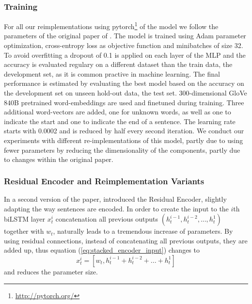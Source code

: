 \subsubsection{Training}
For all our reimplementations using pytorch\footnote{\href{http://pytorch.org/}{http://pytorch.org/}} of the model we follow the parameters of the original paper of \cite{nie2017shortcut}. The model is trained using Adam \citep{kingma2014adam} parameter optimization, cross-entropy loss as objective function and minibatches of size 32. To avoid overfitting a dropout of 0.1 is applied on each layer of the \ac{MLP} and the accuracy is evaluated regulary on a different dataset than the train data, the development set, as it is common practive in machine learning. The final performance is estimated by evaluating the best model based on the accuracy on the development set on unseen hold-out data, the test set. 300-dimensional GloVe 840B pretrained word-embeddings \citep{pennington2014glove} are used and finetuned during training. Three additional word-vectors are added, one for unknown words, as well as one to indicate the start and one to indicate the end of a sentence. The learning rate starts with 0.0002 and is reduced by half every second iteration. We conduct our experiments with different re-implementations of this model, partly due to using fewer parameters by reducing the dimensionality of the components, partly due to changes within the original paper.
\subsubsection{Residual Encoder and Reimplementation Variants}
In a second version of the paper, \cite{nie2017shortcut} introduced the Residual Encoder, slightly adapting the way sentences are encoded. In order to create the input to the $i$th \ac{biLSTM} layer $x_t^i$ concatenation all previous outputs $(h_t^{i-1}, h_t^{i-2}, ... , h_t^1)$ together with $w_t$, naturally leads to a tremendous increase of parameters. By using residual connections, instead of concatenating all previous outputs, they are added up, thus equation (\ref{eq:stacked_encoder_input}) changes to
\begin{equation}
x_t^i = [w_t, h_t^{i-1} + h_t^{i-2} + ... + h_t^1]
\end{equation}
and reduces the parameter size.
